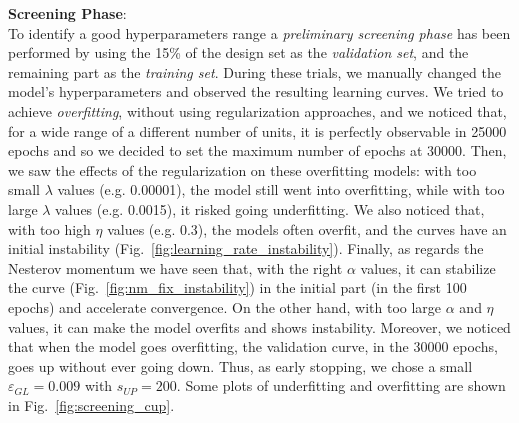 \documentclass[11pt]{article}
\begin{document}
\noindent\textbf{Screening Phase}:\\
To identify a good hyperparameters range a \emph{preliminary screening phase} has been performed by using the 15\% of the design set as the \emph{validation set}, and the remaining part as the \emph{training set}. During these trials, we manually changed the model’s hyperparameters and observed the resulting learning curves. We tried to achieve \emph{overfitting}, without using regularization approaches, and we noticed that, for a wide range of a different number of units, it is perfectly observable in 25000 epochs and so we decided to set the maximum number of epochs at 30000. Then, we saw the effects of the regularization on these overfitting models: with too small $\lambda$ values (e.g. 0.00001), the model still went into overfitting, while with too large $\lambda$ values (e.g. 0.0015), it risked going underfitting. We also noticed that, with too high $\eta$ values (e.g. 0.3), the models often overfit, and the curves have an initial instability (Fig.~\ref{fig:learning_rate_instability}). Finally, as regards the Nesterov momentum we have seen that, with the right $\alpha$ values, it can stabilize the curve (Fig.~\ref{fig:nm_fix_instability}) in the initial part (in the first 100 epochs) and accelerate convergence. On the other hand, with too large $\alpha$ and $\eta$ values, it can make the model overfits and shows instability. Moreover, we noticed that when the model goes overfitting, the validation curve, in the 30000 epochs, goes up without ever going down. Thus, as early stopping, we chose a small $\varepsilon_{GL}=0.009$ with $s_{UP}=200$. Some plots of underfitting and overfitting are shown in Fig.~\ref{fig:screening_cup}.
\end{document}
